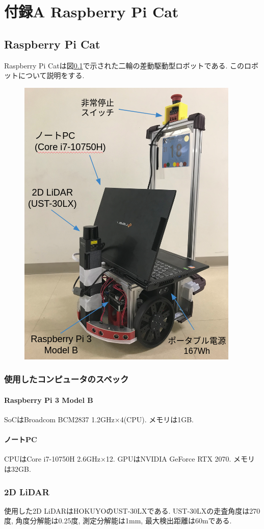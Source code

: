 \chapter*{付録A Raspberry Pi Cat}

\section{Raspberry Pi Cat}
Raspberry Pi Catは図\ref{fig:raspicat}で示された二輪の差動駆動型ロボットである.
このロボットについて説明をする.
\begin{figure}[H]
	\begin{center}
		\includegraphics[width=0.5\linewidth]{figs/raspicat.png}
		\caption{}
		\label{fig:raspicat}
	\end{center}
\end{figure}

\subsection{使用したコンピュータのスペック}

\subsubsection{Raspberry Pi 3 Model B}
SoCはBroadcom BCM2837 1.2GHz×4(CPU).
メモリは1GB.
\subsubsection{ノートPC}
CPUはCore i7-10750H 2.6GHz×12. 
GPUはNVIDIA GeForce RTX 2070.
メモリは32GB.

\subsection{2D LiDAR}
使用した2D LiDARはHOKUYOのUST-30LXである.
UST-30LXの走査角度は270度, 角度分解能は0.25度, 測定分解能は1mm, 最大検出距離は60mである.

